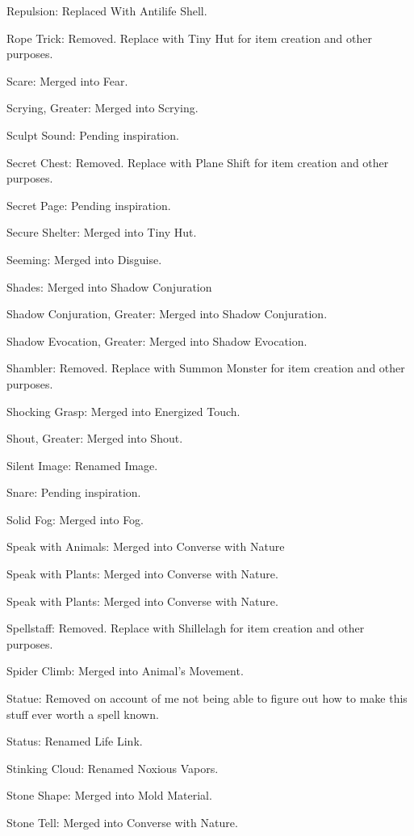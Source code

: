 {\begin{list}{}{\leftmargin=1em}
 \item Repulsion: Replaced With Antilife Shell.
 \item Rope Trick: Removed. Replace with Tiny Hut for item creation and other purposes.
 \item Scare: Merged into Fear.
 \item Scrying, Greater: Merged into Scrying.
 \item Sculpt Sound: Pending inspiration.
 \item Secret Chest: Removed. Replace with Plane Shift for item creation and other purposes.
 \item Secret Page: Pending inspiration.
 \item Secure Shelter: Merged into Tiny Hut.
 \item Seeming: Merged into Disguise.
 \item Shades: Merged into Shadow Conjuration
 \item Shadow Conjuration, Greater: Merged into Shadow Conjuration.
 \item Shadow Evocation, Greater: Merged into Shadow Evocation.
 \item Shambler: Removed. Replace with Summon Monster for item creation and other purposes.
 \item Shocking Grasp: Merged into Energized Touch.
 \item Shout, Greater: Merged into Shout.
 \item Silent Image: Renamed Image.
 \item Snare: Pending inspiration.
 \item Solid Fog: Merged into Fog.
 \item Speak with Animals: Merged into Converse with Nature
 \item Speak with Plants: Merged into Converse with Nature.
 \item Speak with Plants: Merged into Converse with Nature.
 \item Spellstaff: Removed. Replace with Shillelagh for item creation and other purposes.
 \item Spider Climb: Merged into Animal's Movement.
 \item Statue: Removed on account of me not being able to figure out how to make this stuff ever worth a spell known.
 \item Status: Renamed Life Link.
 \item Stinking Cloud: Renamed Noxious Vapors.
 \item Stone Shape: Merged into Mold Material.
 \item Stone Tell: Merged into Converse with Nature.

\end{list}}
